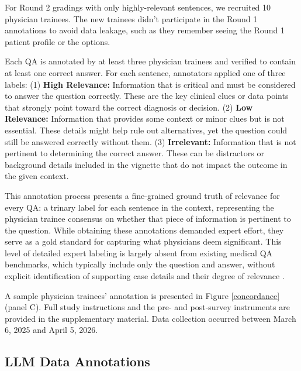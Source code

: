 \documentclass[fleqn,10pt]{wlscirep}
\begin{document}
For Round 2 gradings with only highly-relevant sentences, we recruited 10 physician trainees. The new trainees didn't participate in the Round 1 annotations to avoid data leakage, such as they remember seeing the Round 1 patient profile or the options. 


Each QA is annotated by at least three physician trainees and verified to contain at least one correct answer. For each sentence, annotators applied one of three labels: (1) \textbf{High Relevance:} Information that is critical and must be considered to answer the question correctly. These are the key clinical clues or data points that strongly point toward the correct diagnosis or decision. (2) \textbf{Low Relevance:} Information that provides some context or minor clues but is not essential. These details might help rule out alternatives, yet the question could still be answered correctly without them. (3) \textbf{Irrelevant:} Information that is not pertinent to determining the correct answer. These can be distractors or background details included in the vignette that do not impact the outcome in the given context.

This annotation process presents a fine-grained ground truth of relevance for every QA: a trinary label for each sentence in the context, representing the physician trainee consensus on whether that piece of information is pertinent to the question. While obtaining these annotations demanded expert effort, they serve as a gold standard for capturing what physicians deem significant. This level of detailed expert labeling is largely absent from existing medical QA benchmarks, which typically include only the question and answer, without explicit identification of supporting case details and their degree of relevance \cite{chen_benchmarking_2025}. 

A sample physician trainees' annotation is presented in Figure \ref{concordance} (panel C). Full study instructions and the pre- and post-survey instruments are provided in the supplementary material. Data collection occurred between March 6, 2025 and April 5, 2026.

\subsection{LLM Data Annotations}
\end{document}
